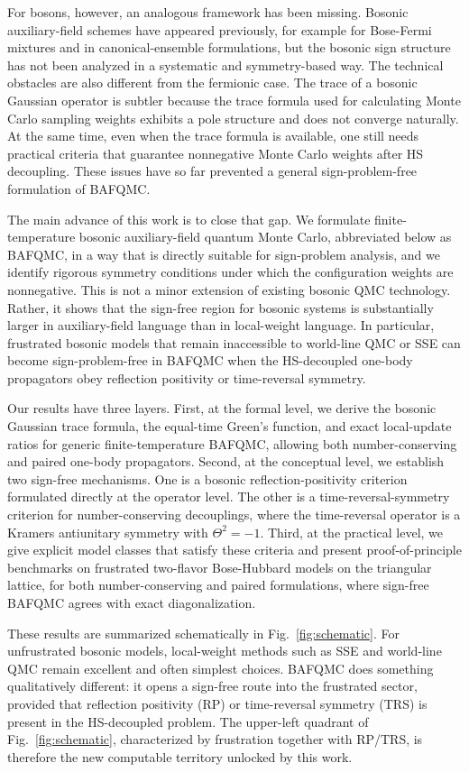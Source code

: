 \documentclass[twocolumn,aps,prb,10pt,amsmath,amssymb,amsthm,superscriptaddress]{revtex4-2}
\theoremstyle{remark}
\begin{document}
For bosons, however, an analogous framework has been missing. Bosonic auxiliary-field schemes have appeared previously, for example for Bose-Fermi mixtures and in canonical-ensemble formulations, but the bosonic sign structure has not been analyzed in a systematic and symmetry-based way. The technical obstacles are also different from the fermionic case. The trace of a bosonic Gaussian operator is subtler because the trace formula used for calculating Monte Carlo sampling weights exhibits a pole structure and does not converge naturally. At the same time, even when the trace formula is available, one still needs practical criteria that guarantee nonnegative Monte Carlo weights after HS decoupling. These issues have so far prevented a general sign-problem-free formulation of BAFQMC.

The main advance of this work is to close that gap. We formulate finite-temperature bosonic auxiliary-field quantum Monte Carlo, abbreviated below as BAFQMC, in a way that is directly suitable for sign-problem analysis, and we identify rigorous symmetry conditions under which the configuration weights are nonnegative. This is not a minor extension of existing bosonic QMC technology. Rather, it shows that the sign-free region for bosonic systems is substantially larger in auxiliary-field language than in local-weight language. In particular, frustrated bosonic models that remain inaccessible to world-line QMC or SSE can become sign-problem-free in BAFQMC when the HS-decoupled one-body propagators obey reflection positivity or time-reversal symmetry.

Our results have three layers. First, at the formal level, we derive the bosonic Gaussian trace formula, the equal-time Green's function, and exact local-update ratios for generic finite-temperature BAFQMC, allowing both number-conserving and paired one-body propagators. Second, at the conceptual level, we establish two sign-free mechanisms. One is a bosonic reflection-positivity criterion formulated directly at the operator level. The other is a time-reversal-symmetry criterion for number-conserving decouplings, where the time-reversal operator is a Kramers antiunitary symmetry with $\Theta^2=-1$. Third, at the practical level, we give explicit model classes that satisfy these criteria and present proof-of-principle benchmarks on frustrated two-flavor Bose-Hubbard models on the triangular lattice, for both number-conserving and paired formulations, where sign-free BAFQMC agrees with exact diagonalization.

These results are summarized schematically in Fig.~\ref{fig:schematic}. For unfrustrated bosonic models, local-weight methods such as SSE and world-line QMC remain excellent and often simplest choices. BAFQMC does something qualitatively different: it opens a sign-free route into the frustrated sector, provided that reflection positivity (RP) or time-reversal symmetry (TRS) is present in the HS-decoupled problem. The upper-left quadrant of Fig.~\ref{fig:schematic}, characterized by frustration together with RP/TRS, is therefore the new computable territory unlocked by this work.
\end{document}
